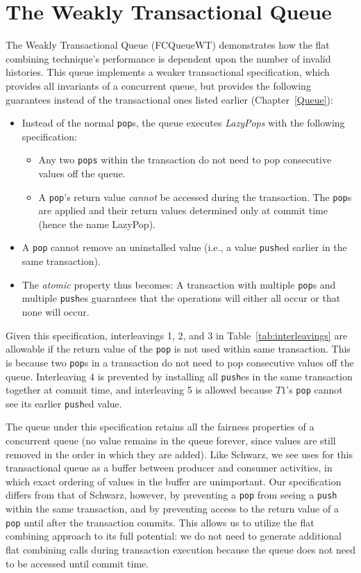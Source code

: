 \section{The Weakly Transactional Queue} 

The Weakly Transactional Queue (FCQueueWT) demonstrates how the flat combining technique's performance is dependent upon the number of invalid histories. This queue implements a weaker transactional specification, which provides all invariants of a concurrent queue, but provides the following guarantees instead of the transactional ones listed earlier (Chapter~\ref{Queue}):
\begin{itemize}
    \item Instead of the normal \texttt{pop}s, the queue executes \emph{LazyPops} with the following specification:
        \begin{itemize}
            \item Any two \texttt{pops} within the transaction do not need to pop consecutive values off the queue.
            \item A \texttt{pop}'s return value \emph{cannot} be accessed during the transaction. The \texttt{pop}s are applied and their return values determined only at commit time (hence the name LazyPop). 
        \end{itemize}
    \item A \texttt{pop} cannot remove an uninstalled value (i.e., a value \texttt{push}ed earlier in the same transaction).
    \item The \emph{atomic} property thus becomes: A transaction with multiple \texttt{pop}s and multiple \texttt{push}es guarantees that the operations will either all occur or that none will occur.
\end{itemize}

Given this specification, interleavings 1, 2, and 3 in Table~\ref{tab:interleavings} are allowable if the return value of the \texttt{pop} is not used within same transaction. This is because two \texttt{pop}s in a transaction do not need to pop consecutive values off the queue. Interleaving 4 is prevented by installing all \texttt{push}es in the same transaction together at commit time, and interleaving 5 is allowed because $T1$'s \texttt{pop} cannot see its earlier \texttt{push}ed value.

The queue under this specification retains all the fairness properties of a concurrent queue (no value remains in the queue forever, since values are still removed in the order in which they are added). Like Schwarz\cite{schwarz}, we see uses for this transactional queue as a buffer between producer and consumer activities, in which exact ordering of values in the buffer are unimportant.
Our specification differs from that of Schwarz\cite{schwarz}, however, by preventing a \texttt{pop} from seeing a \texttt{push} within the same transaction, and by preventing access to the return value of a \texttt{pop} until after the transaction commits. This allows us to utilize the flat combining approach to its full potential: we do not need to generate additional flat combining calls during transaction execution because the queue does not need to be accessed until commit time.

